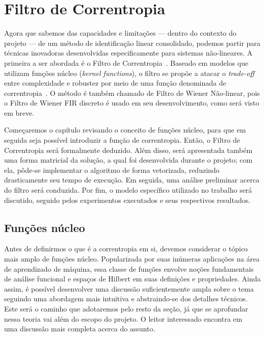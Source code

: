 \chapter{Filtro de Correntropia}
\label{chapter:correntropyfilter}

Agora que sabemos das capacidades e limitações --- dentro do contexto do projeto --- de um método de identificação linear consolidado, podemos partir para técnicas inovadoras desenvolvidas especificamente para sistemas não-lineares. A primeira a ser abordada é o Filtro de Correntropia~\cite{pokharel-2006, pokharel-2007}. Baseado em modelos que utilizam funções núcleo (\textit{kernel functions}), o filtro se propõe a atacar o \textit{trade-off} entre complexidade e robustez por meio de uma função denominada de correntropia~\cite{santamaria-2006}. O método é também chamado de Filtro de Wiener Não-linear, pois o Filtro de Wiener FIR discreto é usado em seu desenvolvimento, como será visto em breve.

Começaremos o capítulo revisando o conceito de funções núcleo, para que em seguida seja possível introduzir a função de correntropia. Então, o Filtro de Correntropia será formalmente deduzido. Além disso, será apresentada também uma forma matricial da solução, a qual foi desenvolvida durante o projeto; com ela, pôde-se implementar o algoritmo de forma vetorizada, reduzindo drasticamente seu tempo de execução. Em seguida, uma análise preliminar acerca do filtro será conduzida. Por fim, o modelo específico utilizado no trabalho será discutido, seguido pelos experimentos executados e seus respectivos resultados.

\section{Funções núcleo}

Antes de definirmos o que é a correntropia em si, devemos considerar o tópico mais amplo de funções núcleo. Popularizada por suas inúmeras aplicações na área de aprendizado de máquina, essa classe de funções envolve noções fundamentais de análise funcional e espaços de Hilbert em suas definições e propriedades. Ainda assim, é possível desenvolver uma discussão suficientemente ampla sobre o tema seguindo uma abordagem mais intuitiva e abstraindo-se dos detalhes técnicos. Este será o caminho que adotaremos pelo resto da seção, já que se aprofundar nessa teoria vai além do escopo do projeto. O leitor interessado encontra em~\cite{principe-2010} uma discussão mais completa acerca do assunto.

